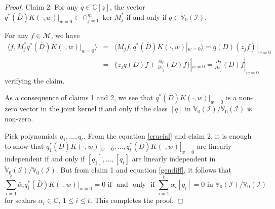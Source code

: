 \documentclass[11pt]{amsart}
\theoremstyle{definition}
\numberwithin{equation}{section}
\begin{document}
\begin{proof}
\textsf{Claim 2}: For any $q\in{{\mathbb C}}[\underline z]$, the vector $q^*(\bar D)K(\cdot,w)|_{w=0}\in\cap_{j=1}^m\ker M_j ^*$ if and only if $q\in\tilde{\mathbb V}_{0}(\mathcal I)$.

For any $f\in\mathcal M$, we have
\begin{eqnarray*}
\langle f, M_j^*q^*(\bar D)K(\cdot,w)|_{w=0}\rangle &=& \langle M_jf, q^*(\bar D)K(\cdot,w)|_{w=0}\rangle = q(D)(z_jf)|_{w=0} \\ &=& \{z_jq(D)f + \frac{\partial q}{\partial z_j}(D)f\}|_{w=0} = \frac{\partial q}{\partial z_j}(D)f|_{w=0}
\end{eqnarray*}
verifying the claim.  

As a consequence of claims 1 and 2, we see that  $q^*(\bar D)K(\cdot,w)|_{w=0}$ is a non-zero vector in the joint kernel if and only if the class $[q]$ in $\tilde{\mathbb V}_{0}(\mathcal I)/\mathbb V_0(\mathcal I)$ is non-zero.

Pick polynomials $q_1,\ldots,q_t$. From the equation \eqref{crucial} and claim 2, it is enough to show that  $q^*_1(\bar D)K(\cdot, w)|_{w=0},\ldots, q^*_t(\bar D)K(\cdot, w)|_{w=0}$ are linearly independent if and only if $[q_1],\ldots,[q_t]$ are linearly independent in $\tilde{\mathbb V}_{0}(\mathcal I)/\mathbb V_{0}(\mathcal I)$.  But from claim 1 and equation \eqref{gendiff}, it follows that 
$$
\sum_{i=1}^t\bar\alpha_iq^*_i(\bar D)K(\cdot,w)|_{w=0} = 0\mbox{~if ~and ~only ~if~} \sum_{i=1}^t\alpha_i[q_i] =0 \mbox{~in~} \tilde{\mathbb V}_{0}(\mathcal I)/\mathbb V_{0}(\mathcal I)
$$ 
for scalars ${\alpha}_i\in{{\mathbb C}},\,1\leq i\leq t$. This completes the proof.
\end{proof}
\end{document}
